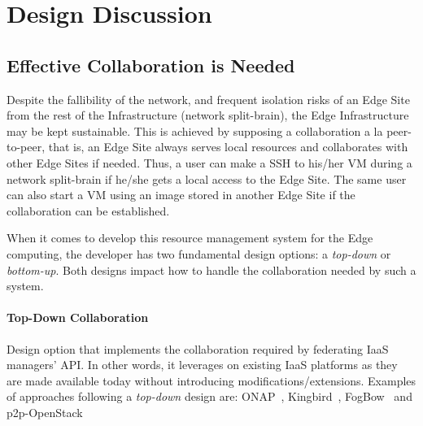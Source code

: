 


\section{Design Discussion}
\label{sec:design_discussion}


\subsection{Effective Collaboration is Needed}

Despite the fallibility of the network, and frequent isolation risks
of an Edge Site from the rest of the Infrastructure (\ie network
split-brain), the Edge Infrastructure may be kept sustainable. This is
achieved by supposing a collaboration a la peer-to-peer, that is, an
Edge Site always serves local resources and collaborates with other
Edge Sites if needed. Thus, a user can make a SSH to his/her VM during a
network split-brain if he/she gets a local access to the Edge Site. The
same user can also start a VM using an image stored in another Edge Site if
the collaboration can be established.

When it comes to develop this resource management system for the Edge
computing, the developer has two fundamental design options: a \emph{top-down} or
\emph{bottom-up}. Both designs impact how to handle the
collaboration needed by such a system.

\paragraph{Top-Down Collaboration}
Design option that implements the collaboration required by
federating IaaS managers' API. In other words, it leverages on existing IaaS platforms as they are made available today without introducing modifications/extensions. Examples of approaches following a \emph{top-down} design are: ONAP~\cite{onap}, Kingbird~\cite{kingbird}, FogBow~\cite{brasileiro2016fogbow} and p2p-OpenStack~\cite{ericsson-p2p}


